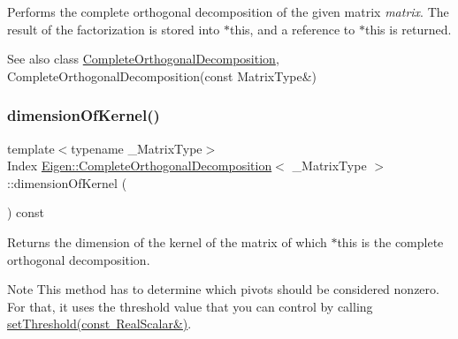 Performs the complete orthogonal decomposition of the given matrix {\itshape matrix}. The result of the factorization is stored into {\ttfamily $\ast$this}, and a reference to {\ttfamily $\ast$this} is returned.

\begin{DoxySeeAlso}{See also}
class \mbox{\hyperlink{class_eigen_1_1_complete_orthogonal_decomposition}{Complete\+Orthogonal\+Decomposition}}, Complete\+Orthogonal\+Decomposition(const Matrix\+Type\&) 
\end{DoxySeeAlso}
\mbox{\label{class_eigen_1_1_complete_orthogonal_decomposition_aca2b59560c4851b7d7701872990a3426}} 
\subsubsection{\texorpdfstring{dimensionOfKernel()}{dimensionOfKernel()}}
{\footnotesize\ttfamily template$<$typename \+\_\+\+Matrix\+Type$>$ \\
Index \mbox{\hyperlink{class_eigen_1_1_complete_orthogonal_decomposition}{Eigen\+::\+Complete\+Orthogonal\+Decomposition}}$<$ \+\_\+\+Matrix\+Type $>$\+::dimension\+Of\+Kernel (\begin{DoxyParamCaption}{ }\end{DoxyParamCaption}) const\hspace{0.3cm}{\ttfamily [inline]}}

\begin{DoxyReturn}{Returns}
the dimension of the kernel of the matrix of which $\ast$this is the complete orthogonal decomposition.
\end{DoxyReturn}
\begin{DoxyNote}{Note}
This method has to determine which pivots should be considered nonzero. For that, it uses the threshold value that you can control by calling \mbox{\hyperlink{class_eigen_1_1_complete_orthogonal_decomposition_aa9c9f7cbde9d58ca5552381b70ad8d82}{set\+Threshold(const Real\+Scalar\&)}}. 
\end{DoxyNote}
\mbox{\label{class_eigen_1_1_complete_orthogonal_decomposition_ad25a868ecd499d6dda0119e4d3659504}} 
